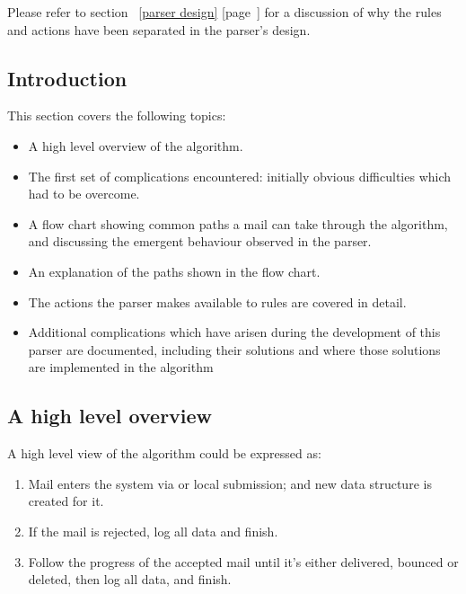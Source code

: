 \documentclass[a4paper,12pt,draft]{article}
\newcommand{\refwithpage}[1]{%
    \empty{}\ref{#1} [page~\pageref{#1}]%
}
\begin{document}
Please refer to section~\refwithpage{parser design} for a discussion of why
the rules and actions have been separated in the parser's design.

\subsection{Introduction}

This section covers the following topics:

\begin{itemize}

    \item A high level overview of the algorithm.

    \item The first set of complications encountered: initially obvious
        difficulties which had to be overcome.

    \item A flow chart showing common paths a mail can take through the
        algorithm, and discussing the emergent behaviour observed in the
        parser.

    \item An explanation of the paths shown in the flow chart.

    \item The actions the parser makes available to rules are covered in
        detail.

    \item Additional complications which have arisen during the development
        of this parser are documented, including their solutions and where
        those solutions are implemented in the algorithm

\end{itemize}

\subsection{A high level overview}

A high level view of the algorithm could be expressed as:

\begin{enumerate}

    \item Mail enters the system via \SMTP{} or local submission; and new
        data structure is created for it.

    \item If the mail is rejected, log all data and finish.

    \item Follow the progress of the accepted mail until it's either
        delivered, bounced or deleted, then log all data, and finish.

\end{enumerate}
\end{document}
